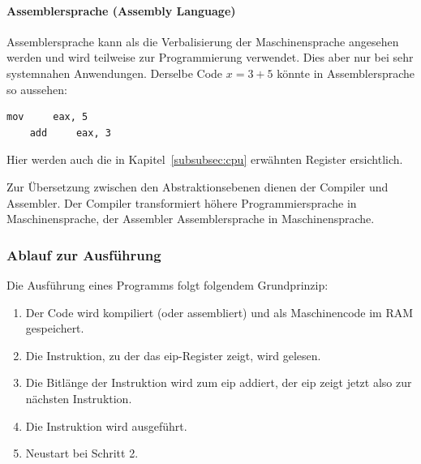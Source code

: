 \documentclass[11pt, a4paper]{article}
\begin{document}
\paragraph{Assemblersprache (Assembly Language)}
Assemblersprache kann als die Verbalisierung der Maschinensprache angesehen werden und wird teilweise zur Programmierung verwendet. Dies aber nur bei sehr systemnahen Anwendungen. Derselbe Code \(x = 3 + 5\) könnte in Assemblersprache so aussehen: 
\begin{lstlisting}[style=LowLevelStyle]
	mov 	eax, 5
	add 	eax, 3
\end{lstlisting}

Hier werden auch die in Kapitel~\ref{subsubsec:cpu} erwähnten Register ersichtlich.

Zur Übersetzung zwischen den Abstraktionsebenen dienen der Compiler und Assembler. Der Compiler transformiert höhere Programmiersprache in Maschinensprache, der Assembler Assemblersprache in Maschinensprache.

\subsubsection{Ablauf zur Ausführung}
Die Ausführung eines Programms folgt folgendem Grundprinzip:
\begin{enumerate}
	\item Der Code wird kompiliert (oder assembliert) und als Maschinencode im RAM gespeichert.
	\item Die Instruktion, zu der das \gls{eip}-Register zeigt, wird gelesen.
	\item Die Bitlänge der Instruktion wird zum \gls{eip} addiert, der \gls{eip} zeigt jetzt also zur nächsten Instruktion.
	\item Die Instruktion wird ausgeführt.
	\item Neustart bei Schritt 2.
\end{enumerate}
\end{document}
